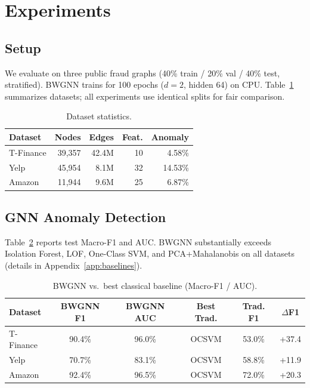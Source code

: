 \documentclass[sigconf,nonacm]{acmart}
\begin{document}
\section{Experiments}
\label{sec:exp}

\subsection{Setup}
We evaluate on three public fraud graphs (40\% train / 20\% val / 40\% test, stratified).
BWGNN trains for 100 epochs ($d{=}2$, hidden 64) on CPU.
Table~\ref{tab:datasets} summarizes datasets; all experiments use identical splits for fair comparison.

\begin{table}[t]
\caption{Dataset statistics.}
\label{tab:datasets}
\small
\begin{tabular}{lrrrr}
\toprule
Dataset & Nodes & Edges & Feat. & Anomaly \\
\midrule
T-Finance & 39{,}357 & 42.4M & 10 & 4.58\% \\
Yelp      & 45{,}954 &  8.1M & 32 & 14.53\% \\
Amazon    & 11{,}944 &  9.6M & 25 & 6.87\% \\
\bottomrule
\end{tabular}
\end{table}

\subsection{GNN Anomaly Detection}
Table~\ref{tab:gnn} reports test Macro-F1 and AUC.
BWGNN substantially exceeds Isolation Forest, LOF, One-Class SVM, and PCA+Mahalanobis on all datasets (details in Appendix~\ref{app:baselines}).

\begin{table}[t]
\caption{BWGNN vs.\ best classical baseline (Macro-F1 / AUC).}
\label{tab:gnn}
\small
\begin{tabular}{lccccc}
\toprule
Dataset & BWGNN F1 & BWGNN AUC & Best Trad. & Trad. F1 & $\Delta$F1 \\
\midrule
T-Finance & 90.4\% & 96.0\% & OCSVM  & 53.0\% & +37.4 \\
Yelp      & 70.7\% & 83.1\% & OCSVM  & 58.8\% & +11.9 \\
Amazon    & 92.4\% & 96.5\% & OCSVM  & 72.0\% & +20.3 \\
\bottomrule
\end{tabular}
\end{table}
\end{document}

